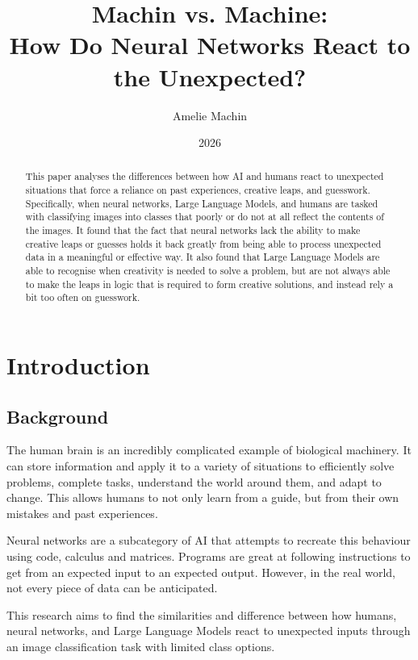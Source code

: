 \documentclass{article}
\title{Machin vs. Machine: \\ How Do Neural Networks React to the Unexpected?}
\author{Amelie Machin}
\date{2026}
\begin{document}
\null  %
\nointerlineskip  %
\vfill
\let\snewpage \newpage
\let\newpage \relax
\maketitle
\begin{abstract}
\noindent This paper analyses the differences between how AI and humans react to unexpected situations that force a reliance on past experiences, creative leaps, and guesswork. Specifically, when neural networks, Large Language Models, and humans are tasked with classifying images into classes that poorly or do not at all reflect the contents of the images. It found that the fact that neural networks lack the ability to make creative leaps or guesses holds it back greatly from being able to process unexpected data in a meaningful or effective way. It also found that Large Language Models are able to recognise when creativity is needed to solve a problem, but are not always able to make the leaps in logic that is required to form creative solutions, and instead rely a bit too often on guesswork.
\end{abstract}
\let \newpage \snewpage
\vfill 
\break %

\tableofcontents
\newpage

\section{Introduction}
\subsection{Background}
The human brain is an incredibly complicated example of biological machinery. It can store information and apply it to a variety of situations to efficiently solve problems, complete tasks, understand the world around them, and adapt to change. This allows humans to not only learn from a guide, but from their own mistakes and past experiences.

Neural networks are a subcategory of AI that attempts to recreate this behaviour using code, calculus and matrices. Programs are great at following instructions to get from an expected input to an expected output. However, in the real world, not every piece of data can be anticipated.

This research aims to find the similarities and difference between how humans, neural networks, and Large Language Models react to unexpected inputs through an image classification task with limited class options.
\end{document}
